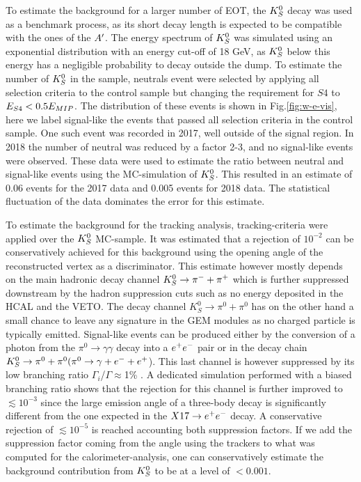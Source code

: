 To estimate the background for a larger number of EOT, the $K^0_S$ decay was used as a benchmark process, as its short decay length is expected to be compatible with the ones of the $A'$. The energy spectrum of $K^0_S$ was simulated using an exponential distribution with an energy cut-off of 18 GeV, as $K^0_S$ below this energy has a negligible probability to decay outside the dump. To estimate the number of $K^0_S$ in the sample, neutrals event were selected by applying all selection criteria to the control sample but changing the requirement for $S4$ to $E_{S4} < 0.5 E_{MIP}$. The distribution of these events is shown in Fig.\ref{fig:w-e-vis}, here we label signal-like the events that passed all selection criteria in the control sample. One such event was recorded in 2017, well outside of the signal region. In 2018 the number of neutral was reduced by a factor 2-3, and no signal-like events were observed. These data were used to estimate the ratio between neutral and signal-like events using the MC-simulation of $K^0_S$. This resulted in an estimate of 0.06 events for the 2017 data and 0.005 events for 2018 data. The statistical fluctuation of the data dominates the error for this estimate.

To estimate the background for the tracking analysis, tracking-criteria were applied over the $K^0_S$ MC-sample. It was estimated that a rejection of $10^{-2}$ can be conservatively achieved for this background using the opening angle of the reconstructed vertex as a discriminator. This estimate however mostly depends on the main hadronic decay channel $K^0_S \rightarrow \pi^- + \pi^+$ which is further suppressed downstream by the hadron suppression cuts such as no energy deposited in the HCAL and the VETO. The decay channel $K^0_S \rightarrow \pi^0 + \pi^0$ has on the other hand a small chance to leave any signature in the GEM modules as no charged particle is typically emitted. Signal-like events can be produced either by the conversion of a photon from the $\pi^0 \rightarrow \gamma \gamma$ decay into a $e^+e^-$ pair or in the decay chain $K^0_S \rightarrow \pi^0 + \pi^0 (\pi^0 \rightarrow \gamma + e^- + e^+$). This last channel is however suppressed by its low branching ratio $\Gamma_i$/$\Gamma \approx $1\% \cite{review-particle-physics}. A dedicated simulation performed with a biased branching ratio shows that the rejection for this channel is further improved to $\lesssim 10^{-3}$ since the large emission angle of a three-body decay is significantly different from the one expected in the $X17 \rightarrow e^+ e^-$ decay. A conservative rejection of $\lesssim 10^{-5}$ is reached accounting both suppression factors. If we add the suppression factor coming from the angle using the trackers to what was computed for the calorimeter-analysis, one can conservatively estimate the background contribution from $K^0_S$ to be at a level of $<0.001$.



